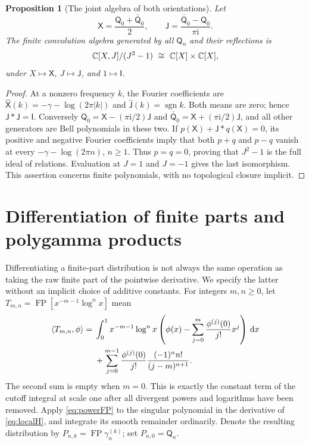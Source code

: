 \documentclass[11pt]{article}
\numberwithin{equation}{section}
\newtheorem{proposition}[theorem]{Proposition}
\theoremstyle{definition}\newtheorem{definition}[theorem]{Definition}
\theoremstyle{remark}\newtheorem{remark}[theorem]{Remark}
\DeclareMathOperator{\FP}{FP}
\newcommand{\dd}{\,\mathrm d}
\newcommand{\iu}{\mathrm i}
\newcommand{\qn}[1]{\mathsf Q_{#1}}
\newcommand{\id}{\mathsf I}
\begin{document}
\begin{proposition}[The joint algebra of both orientations]
\label{prop:jointalgebra}
Let
\[
 \mathsf X=\frac{\qn0+\check{\qn0}}2,\qquad
 \mathsf J=\frac{\check{\qn0}-\qn0}{\pi\iu}.
\]
The finite convolution algebra generated by all $\qn n$ and their
reflections is
\begin{equation}\label{eq:jointalgebra}
 \mathbb C[X,J]/(J^2-1)\ \cong\ \mathbb C[X]\times\mathbb C[X],
\end{equation}
under $X\mapsto\mathsf X$, $J\mapsto\mathsf J$, and $1\mapsto\id$.
\end{proposition}
\begin{proof}
At a nonzero frequency $k$, the Fourier coefficients are
$\widehat{\mathsf X}(k)=-\gamma-\log(2\pi|k|)$ and
$\widehat{\mathsf J}(k)=\operatorname{sgn}k$. Both means are zero;
hence $\mathsf J*\mathsf J=\id$. Conversely
$\qn0=\mathsf X-(\pi\iu/2)\mathsf J$ and
$\check{\qn0}=\mathsf X+(\pi\iu/2)\mathsf J$, and all other generators
are Bell polynomials in these two. If
$p(\mathsf X)+\mathsf J*q(\mathsf X)=0$, its positive and negative
Fourier coefficients imply that both $p+q$ and $p-q$ vanish at every
$-\gamma-\log(2\pi n)$, $n\ge1$. Thus $p=q=0$, proving that
$J^2-1$ is the full ideal of relations. Evaluation at $J=1$ and $J=-1$
gives the last isomorphism. This assertion concerns finite polynomials,
with no topological closure implicit.
\end{proof}

\section{Differentiation of finite parts and polygamma products}
\label{sec:derivatives}

Differentiating a finite-part distribution is not always the same
operation as taking the raw finite part of the pointwise derivative.
We specify the latter without an implicit choice of additive constants.
For integers $m,n\ge0$, let $T_{m,n}=\FP[x^{-m-1}\log^n x]$ mean
\begin{align}\label{eq:powerFP}
 \langle T_{m,n},\phi\rangle={}&
 \int_0^1x^{-m-1}\log^n x
 \left(\phi(x)-\sum_{j=0}^m\frac{\phi^{(j)}(0)}{j!}x^j\right)\dd x
 \notag\\
 &+\sum_{j=0}^{m-1}\frac{\phi^{(j)}(0)}{j!}
             \frac{(-1)^n n!}{(j-m)^{n+1}}.
\end{align}
The second sum is empty when $m=0$. This is exactly the constant term of
the cutoff integral at scale one after all divergent powers and
logarithms have been removed. Apply \eqref{eq:powerFP} to the singular
polynomial in the derivative of \eqref{eq:localH}, and integrate its
smooth remainder ordinarily. Denote the resulting distribution by
$P_{n,k}=\FP\gamma_n^{(k)}$; set $P_{n,0}=\qn n$.
\end{document}
